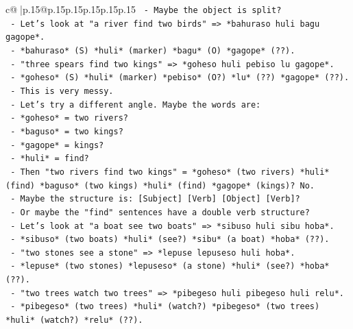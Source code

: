 \documentclass{article}
\begin{document}
{\begin{supertabular}{c@{$\;$}|p{.15\linewidth}@{}p{.15\linewidth}p{.15\linewidth}p{.15\linewidth}p{.15\linewidth}p{.15\linewidth}}
{{{\texttt{                          {-} Maybe the object is split?} \\
\texttt{                          {-} Let's look at "a river find two birds" => *bahuraso huli bagu gagope*.} \\
\texttt{                          {-} *bahuraso* (S) *huli* (marker) *bagu* (O) *gagope* (??).} \\
\texttt{                          {-} "three spears find two kings" => *goheso huli pebiso lu gagope*.} \\
\texttt{                          {-} *goheso* (S) *huli* (marker) *pebiso* (O?) *lu* (??) *gagope* (??).} \\
\texttt{                          {-} This is very messy.} \\
\texttt{                          {-} Let's try a different angle. Maybe the words are:} \\
\texttt{                            {-} *goheso* = two rivers?} \\
\texttt{                            {-} *baguso* = two kings?} \\
\texttt{                            {-} *gagope* = kings?} \\
\texttt{                            {-} *huli* = find?} \\
\texttt{                            {-} Then "two rivers find two kings" = *goheso* (two rivers) *huli* (find) *baguso* (two kings) *huli* (find) *gagope* (kings)? No.} \\
\texttt{                          {-} Maybe the structure is: {[}Subject{]} {[}Verb{]} {[}Object{]} {[}Verb{]}?} \\
\texttt{                          {-} Or maybe the "find" sentences have a double verb structure?} \\
\texttt{                          {-} Let's look at "a boat see two boats" => *sibuso huli sibu hoba*.} \\
\texttt{                          {-} *sibuso* (two boats) *huli* (see?) *sibu* (a boat) *hoba* (??).} \\
\texttt{                          {-} "two stones see a stone" => *lepuse lepuseso huli hoba*.} \\
\texttt{                          {-} *lepuse* (two stones) *lepuseso* (a stone) *huli* (see?) *hoba* (??).} \\
\texttt{                          {-} "two trees watch two trees" => *pibegeso huli pibegeso huli relu*.} \\
\texttt{                          {-} *pibegeso* (two trees) *huli* (watch?) *pibegeso* (two trees) *huli* (watch?) *relu* (??).} \\
}}}
\end{supertabular}}
\end{document}
